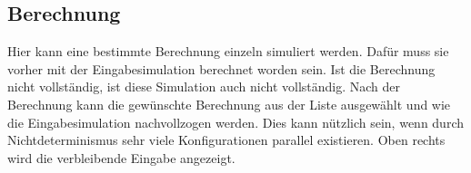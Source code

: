 \subsection{Berechnung}
Hier kann eine bestimmte Berechnung einzeln simuliert werden. Dafür muss sie vorher mit der Eingabesimulation berechnet worden sein. Ist die Berechnung nicht vollständig, ist diese Simulation auch nicht vollständig. Nach der Berechnung kann die gewünschte Berechnung aus der Liste ausgewählt und wie die Eingabesimulation nachvollzogen werden. Dies kann nützlich sein, wenn durch Nichtdeterminismus sehr viele Konfigurationen parallel existieren. Oben rechts wird die verbleibende Eingabe angezeigt.
\endinput
